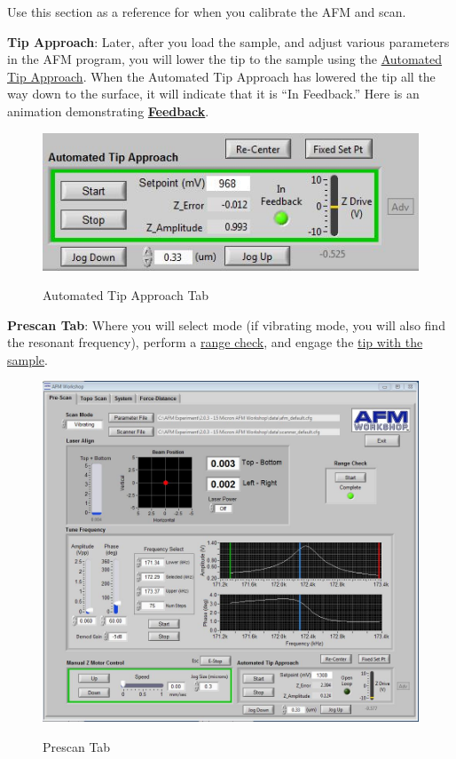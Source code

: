 \documentclass{../lab}
\begin{document}
Use this section as a reference for when you calibrate the AFM and scan.

\textbf{Tip Approach}:  Later, after you load the sample, and adjust various parameters in the AFM program, you will lower the tip to the sample using the \hyperref[subsec:TipApproach]{Automated Tip Approach}.  When the Automated Tip Approach has lowered the tip all the way down to the surface, it will indicate that it is ``In Feedback.'' Here is an animation demonstrating \href{http://experimentationlab.berkeley.edu/sites/default/files/AFMImages/4.4.\%20feedback.flv\_converted.mp4}{\textbf{Feedback}}.

\begin{figure}[H]
    \centering
    \href{http://experimentationlab.berkeley.edu/sites/default/files/AFMImages/infeedback.JPG}{\includegraphics[width=0.95\linewidth]{images/infeedback.JPG}}
    \label{fig:infeedback}
    \caption{Automated Tip Approach Tab}
\end{figure}

\pagebreak

\textbf{Prescan Tab}: Where you will select mode (if vibrating mode, you will also find the resonant frequency), perform a \hyperref[subsubsec:RangeCheck]{range check}, and engage the \hyperref[subsec:TipApproach]{tip with the sample}.

\begin{figure}[H]
    \centering
    \href{http://experimentationlab.berkeley.edu/sites/default/files/AFMImages/prescantab.JPG}{\includegraphics[width=0.8\linewidth]{images/prescantab.JPG}}
    \label{fig:prescantab}
    \caption{Prescan Tab}
\end{figure}
\end{document}
